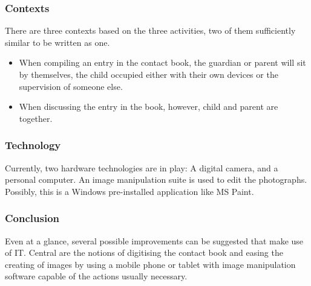\subsubsection*{Contexts}
There are three contexts based on the three activities, two of them sufficiently similar to be written as one.
\begin{itemize}
	\item When compiling an entry in the contact book, the guardian or parent will sit by themselves, the child occupied either with their own devices or the supervision of someone else. 
	\item When discussing the entry in the book, however, child and parent are together.
\end{itemize}
\subsubsection*{Technology}
Currently, two hardware technologies are in play: A digital camera, and a personal computer.
An image manipulation suite is used to edit the photographs. Possibly, this is a Windows pre-installed application like MS Paint.
\subsubsection*{Conclusion}
Even at a glance, several possible improvements can be suggested that make use of IT. Central are the notions of digitising the contact book and easing the creating of images by using a mobile phone or tablet with image manipulation software capable of the actions usually necessary.